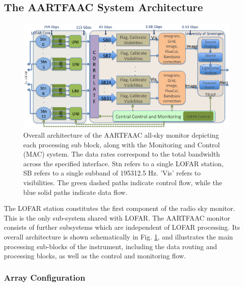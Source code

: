 \documentclass{ws-jai}
\begin{document}
\subsection {\label{subsec:aartfaac}  The AARTFAAC System Architecture}
\begin{figure}[htbp]
\centering
\includegraphics[width=1\textwidth]{Figs/Overall_arch_afaac/Slide1.png}
\caption {Overall  architecture of the  AARTFAAC all-sky monitor  depicting each
  processing sub block, along with the  Monitoring and Control (MAC) system. The
  data  rates   correspond  to   the  total   bandwidth  across   the  specified
  interface. Stn refers to a single LOFAR station, SB refers to a single subband
  of 195312.5 Hz. 'Vis' refers to  visibilities. The green dashed paths indicate
  control flow, while the blue solid paths indicate data flow. }
\label{fig:afaac_arch}
\end{figure}

The LOFAR station constitutes the first component of the radio sky monitor. This
is the  only sub-system  shared with  LOFAR.  The  AARTFAAC monitor  consists of
further  subsystems which  are  independent of  LOFAR  processing.  Its  overall
architecture   is  shown   schematically  in   Fig.  \ref{fig:afaac_arch},   and
illustrates the main processing sub-blocks of the instrument, including the data
routing and processing blocks, as well as the control and monitoring flow.


\subsubsection {Array Configuration}
\end{document}
